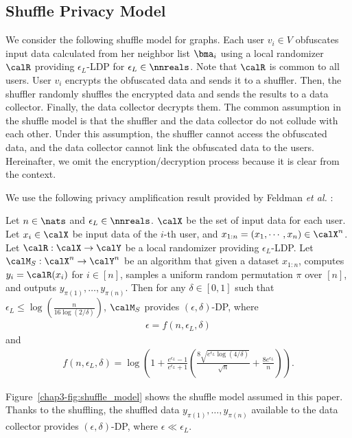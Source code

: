 \subsection{Shuffle Privacy Model}
\label{chap3-sub:shuffle}
We consider the following shuffle model for graphs. 
Each user $v_i \in V$ obfuscates 
input data calculated from her neighbor list $\bma_i$ 
using a local randomizer $\calR$ providing $\epsilon_L$-LDP for $\epsilon_L \in \nnreals$. 
Note that $\calR$ is common to all users. 
User $v_i$ encrypts the obfuscated data and sends it to a shuffler. 
Then, the shuffler randomly shuffles the encrypted data and sends the results to a data collector. 
Finally, the data collector decrypts them. 
The common assumption in the shuffle model is that the shuffler and the data collector do not collude with each other. 
Under this assumption, the shuffler cannot access the obfuscated data, and the data collector cannot link the obfuscated data to the users. 
Hereinafter, we omit the encryption/decryption process because it is clear from the context. 

We use the following privacy amplification result provided by Feldman \textit{et al.} \cite{Feldman_FOCS21}:

\begin{theorem}  \label{chap3-thm:shuffle}
Let $n \in \nats$ and $\epsilon_L \in \nnreals$. 
$\calX$ be the set of input data for each user. 
Let $x_i \in \calX$ be input data of the $i$-th user, and 
$x_{1:n} = (x_1, \cdots, x_n) \in \calX^n$. 
Let $\calR: \calX \rightarrow \calY$ be a local randomizer providing $\epsilon_L$-LDP. 
Let $\calM_S: \calX^n \rightarrow \calY^n$ be an algorithm that given a dataset $x_{1:n}$, computes $y_i = \calR(x_i)$ for $i \in [n]$, samples a uniform random permutation $\pi$ over $[n]$, and outputs $y_{\pi(1)}, \ldots, y_{\pi(n)}$. 
Then for any $\delta \in [0,1]$ such that $\epsilon_L \leq \log (\frac{n}{16 \log (2/\delta)})$, $\calM_S$ provides $(\epsilon, \delta)$-DP, where
\begin{align}
\epsilon = f(n, \epsilon_L, \delta)
\label{chap3-eq:shuffle_epsilon_f}
\end{align}
and 
\begin{align}
f(n, \epsilon_L, \delta) = \log \left( 1 + \frac{e^{\epsilon_L}-1}{e^{\epsilon_L}+1} \left( \frac{8\sqrt{e^{\epsilon_L} \log(4/\delta)}}{\sqrt{n}} + \frac{8 e^{\epsilon_L}}{n} \right) \right).
\label{chap3-eq:shuffle_epsilon}
\end{align}
\end{theorem}
Figure~\ref{chap3-fig:shuffle_model} shows the shuffle model assumed in this paper. 
Thanks to the shuffling, the shuffled data $y_{\pi(1)}, \ldots, y_{\pi(n)}$ available to the data collector provides $(\epsilon, \delta)$-DP, where $\epsilon \ll \epsilon_L$. 

